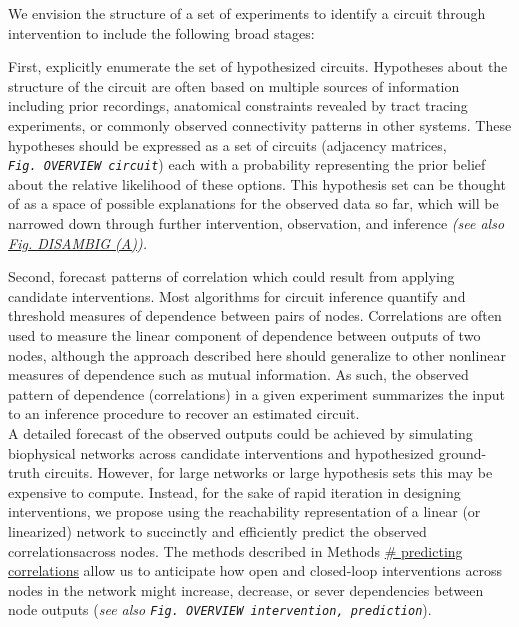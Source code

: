 \documentclass{article}
\begin{document}
We envision the structure of a set of experiments to identify a circuit through intervention to include the following broad stages:

First, explicitly enumerate the set of hypothesized circuits. Hypotheses about the structure of the circuit are often based on multiple sources of information including prior recordings, anatomical constraints revealed by tract tracing experiments, or commonly observed connectivity patterns in other systems. These hypotheses should be expressed as a set of circuits (adjacency matrices,
\emph{\texttt{Fig.\ OVERVIEW\ circuit}}) each with a probability representing the prior belief about the relative likelihood of these options. This hypothesis set can be thought of as a space of possible explanations for the observed data so far, which will be narrowed down through further intervention, observation, and inference \emph{(see also
\protect\hyperlink{fig-disambig}{Fig. DISAMBIG (A)}).}

Second, forecast patterns of correlation which could result from applying candidate interventions. Most algorithms for circuit inference quantify and threshold measures of dependence between pairs of nodes. Correlations are often used to measure the linear component of dependence between outputs of two nodes, although the approach described here should generalize to other nonlinear measures of dependence such as mutual information. As such, the observed pattern of dependence
(correlations) in a given experiment summarizes the input to an inference procedure to recover an estimated circuit.\\
\hspace*{0.333em}\hspace*{0.333em}\hspace*{0.333em}\hspace*{0.333em}A detailed forecast of the observed outputs could be achieved by simulating biophysical networks across candidate interventions and hypothesized ground-truth circuits. However, for large networks or large hypothesis sets this may be expensive to compute. Instead, for the sake of rapid iteration in designing interventions, we propose using the reachability representation of a linear (or linearized) network to succinctly and efficiently predict the observed correlationsacross nodes. The methods described in Methods \href{REF-SECTION-HERE}{\#
predicting correlations} allow us to anticipate how open and closed-loop interventions across nodes in the network might increase, decrease, or sever dependencies between node outputs (\emph{see also
\texttt{Fig.\ OVERVIEW\ intervention,\ prediction}}).
\end{document}
